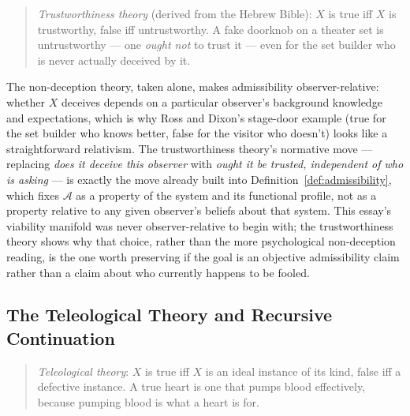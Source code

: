 \documentclass[12pt,a4paper]{article}
\theoremstyle{plain}
\theoremstyle{definition}
\theoremstyle{remark}
\newcommand{\Adm}{\mathcal{A}}
\begin{document}
\begin{quote}
\emph{Trustworthiness theory} (derived from the Hebrew Bible): $X$ is true iff $X$ is trustworthy, false iff untrustworthy. A fake doorknob on a theater set is untrustworthy — one \emph{ought not} to trust it — even for the set builder who is never actually deceived by it.
\end{quote}

The non-deception theory, taken alone, makes admissibility observer-relative: whether $X$ deceives depends on a particular observer's background knowledge and expectations, which is why Ross and Dixon's stage-door example (true for the set builder who knows better, false for the visitor who doesn't) looks like a straightforward relativism. The trustworthiness theory's normative move — replacing \emph{does it deceive this observer} with \emph{ought it be trusted, independent of who is asking} — is exactly the move already built into Definition~\ref{def:admissibility}, which fixes $\Adm$ as a property of the system and its functional profile, not as a property relative to any given observer's beliefs about that system. This essay's viability manifold was never observer-relative to begin with; the trustworthiness theory shows why that choice, rather than the more psychological non-deception reading, is the one worth preserving if the goal is an objective admissibility claim rather than a claim about who currently happens to be fooled.

\subsection{The Teleological Theory and Recursive Continuation}
\label{subsec:teleological-continuation}

\begin{quote}
\emph{Teleological theory}: $X$ is true iff $X$ is an ideal instance of its kind, false iff a defective instance. A true heart is one that pumps blood effectively, because pumping blood is what a heart is for.
\end{quote}
\end{document}
